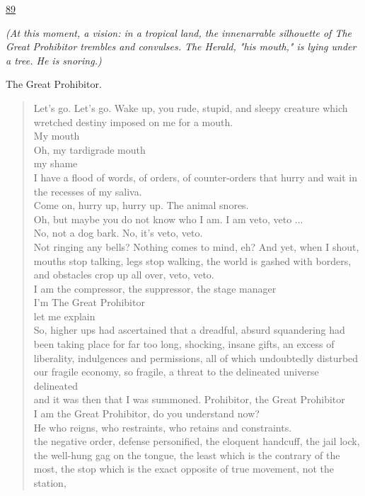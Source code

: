 \documentclass[letterpaper,article,12pt,oneside,notitlepage]{memoir}
\begin{document}
\clearpage

\href{http://cesaire.elotroalex.com/chiens/chiens/p089.html}{89}

\textit{(At this moment, a vision: in a tropical land, the innenarrable silhouette of The Great Prohibitor trembles and convulses. The Herald, "his mouth," is lying under a tree. He is snoring.)}

\begin{center}The Great Prohibitor.\end{center}

\begin{verse}
Let's go. Let's go. Wake up, you rude, stupid, and sleepy creature which wretched destiny imposed on me for a mouth.  \\
My mouth \\
Oh, my tardigrade mouth \\
my shame \\
I have a flood of words, of orders, of counter-orders that hurry and wait in the recesses of my saliva.  \\
Come on, hurry up, hurry up. The animal snores. \\
Oh, but maybe you do not know who I am. I am veto, veto ... \\
No, not a dog bark. No, it's veto, veto. \\
Not ringing any bells? Nothing comes to mind, eh? And yet, when I shout, mouths stop talking, legs stop walking, the world is gashed with borders, and obstacles crop up all over, veto, veto.  \\
I am the compressor, the suppressor, the stage manager \\
I'm The Great Prohibitor \\
let me explain \\
So, higher ups had ascertained that a dreadful, absurd squandering had been taking place for far too long, shocking, insane gifts, an excess of liberality, indulgences and permissions, all of which undoubtedly disturbed our fragile economy, so fragile, a threat to the delineated universe \\
delineated \\
and it was then that I was summoned. Prohibitor, the Great Prohibitor \\
I am the Great Prohibitor, do you understand now? \\
He who reigns, who restraints, who retains and constraints. \\
the negative order, defense personified, the eloquent handcuff, the jail lock, the well-hung gag on the tongue, the least which is the contrary of the most, the stop which is the exact opposite of true movement, not the station, \\
\end{verse}
\end{document}
